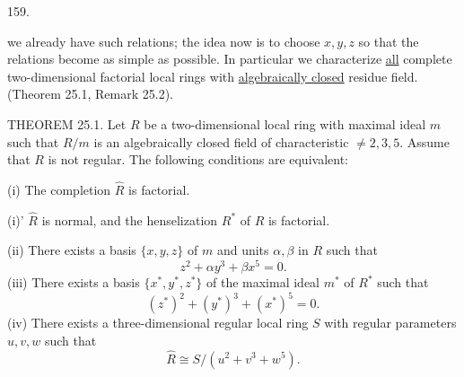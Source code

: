 159.

we already have such relations; the idea now is to choose $x,y,z$ so that the relations become as simple as possible. In particular we characterize \uline{all} complete two-dimensional factorial local rings with \uline{algebraically closed} residue field. (Theorem 25.1, Remark 25.2).

THEOREM 25.1. Let $R$ be a two-dimensional local ring with maximal ideal $m$ such that $R/m$ is an algebraically closed field of characteristic $\ne2,3,5$. Assume that $R$ is not regular. The following conditions are equivalent:

(i) The completion $\widehat R$ is factorial.

(i)' $\widehat R$ is normal, and the henselization $R^*$ of $R$ is factorial.

(ii) There exists a basis $\{x,y,z\}$ of $m$ and units $\alpha,\beta$ in $R$ such that
\[
z^2+\alpha y^3+\beta x^5=0.
\]
(iii) There exists a basis $\{x^*,y^*,z^*\}$ of the maximal ideal $m^*$ of $R^*$ such that
\[
(z^*)^2+(y^*)^3+(x^*)^5=0.
\]
(iv) There exists a three-dimensional regular local ring $S$ with regular parameters $u,v,w$ such that
\[
\widehat R\cong S/(u^2+v^3+w^5).
\]
